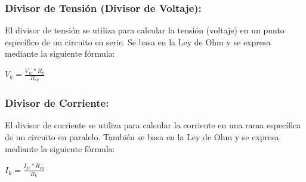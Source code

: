 \documentclass[10pt]{article}
\begin{document}
\begin{multicols}{2}
\subsubsection{Divisor de Tensión (Divisor de Voltaje):}
El divisor de tensión se utiliza para calcular la tensión (voltaje) en un punto específico de un circuito en serie. Se basa en la Ley de Ohm y se expresa mediante la siguiente fórmula: 
\begin{center}
$V_{k}=\frac{V_{fc}*R_{k}}{R_{eq}}$
\end{center}
\subsubsection{Divisor de Corriente:}
El divisor de corriente se utiliza para calcular la corriente en una rama específica de un circuito en paralelo. También se basa en la Ley de Ohm y se expresa mediante la siguiente fórmula:
\begin{center}
	$I_{k}=\frac{I_{fc}*R_{eq}}{R_{k}}$
\end{center}
\end{multicols}
\end{document}

